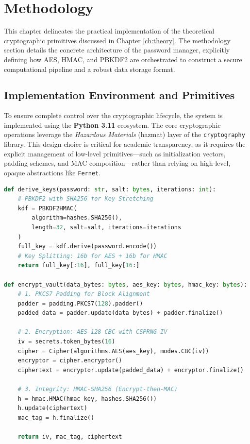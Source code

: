 \chapter{Methodology}
\label{ch:methodology}

This chapter delineates the practical implementation of the theoretical cryptographic primitives discussed in Chapter \ref{ch:theory}. The methodology section details the concrete architecture of the password manager, explicitly defining how AES, HMAC, and PBKDF2 are orchestrated to construct a secure computational pipeline and a robust data storage format.

\section{Implementation Environment and Primitives}

To ensure complete control over the cryptographic lifecycle, the system is implemented using the \textbf{Python 3.11} ecosystem. The core cryptographic operations leverage the \textit{Hazardous Materials} (hazmat) layer of the \texttt{cryptography} library. This design choice is critical for academic transparency, as it requires the explicit management of low-level primitives—such as initialization vectors, padding schemes, and MAC composition—rather than relying on high-level, opaque abstractions like \texttt{Fernet}.

\begin{lstlisting}[language=Python, caption=Explicit Cryptographic Implementation Pipeline, label=lst:pipeline]
def derive_keys(password: str, salt: bytes, iterations: int):
    # PBKDF2 with SHA256 for Key Stretching
    kdf = PBKDF2HMAC(
        algorithm=hashes.SHA256(),
        length=32, salt=salt, iterations=iterations
    )
    full_key = kdf.derive(password.encode())
    # Key Splitting: 16b for AES + 16b for HMAC
    return full_key[:16], full_key[16:]

def encrypt_vault(data_bytes: bytes, aes_key: bytes, hmac_key: bytes):
    # 1. PKCS7 Padding for Block Alignment
    padder = padding.PKCS7(128).padder()
    padded_data = padder.update(data_bytes) + padder.finalize()

    # 2. Encryption: AES-128-CBC with CSPRNG IV
    iv = secrets.token_bytes(16)
    cipher = Cipher(algorithms.AES(aes_key), modes.CBC(iv))
    encryptor = cipher.encryptor()
    ciphertext = encryptor.update(padded_data) + encryptor.finalize()

    # 3. Integrity: HMAC-SHA256 (Encrypt-then-MAC)
    h = hmac.HMAC(hmac_key, hashes.SHA256())
    h.update(ciphertext)
    mac_tag = h.finalize()

    return iv, mac_tag, ciphertext
\end{lstlisting}

